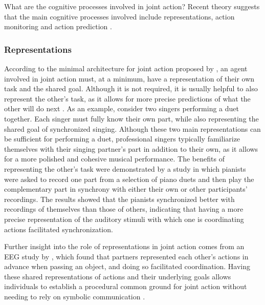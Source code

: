 \documentclass[10pt,a4paper,onecolumn]{article}
\begin{document}
What are the cognitive processes involved in joint action? Recent theory suggests that the main cognitive processes involved include representations, action monitoring and action prediction \autocite{vesperMinimalArchitectureJoint2010,loehrMonitoringIndividualJoint2013,sebanzJointActionBodies2006}.

\hypertarget{representations}{%
\subsubsection{Representations}\label{representations}}

According to the minimal architecture for joint action proposed by \textcite{vesperMinimalArchitectureJoint2010}, an agent involved in joint action must, at a minimum, have a representation of their own task and the shared goal. Although it is not required, it is usually helpful to also represent the other's task, as it allows for more precise predictions of what the other will do next \autocite{boltSensoryAttenuationAuditory2021}. As an example, consider two singers performing a duet together. Each singer must fully know their own part, while also representing the shared goal of synchronized singing. Although these two main representations can be sufficient for performing a duet, professional singers typically familiarize themselves with their singing partner's part in addition to their own, as it allows for a more polished and cohesive musical performance. The benefits of representing the other's task were demonstrated by a study \autocite{kellerPianistsDuetBetter2007} in which pianists were asked to record one part from a selection of piano duets and then play the complementary part in synchrony with either their own or other participants' recordings. The results showed that the pianists synchronized better with recordings of themselves than those of others, indicating that having a more precise representation of the auditory stimuli with which one is coordinating actions facilitated synchronization.

Further insight into the role of representations in joint action comes from an EEG study by \textcite{kourtisPredictiveRepresentationOther2012}, which found that partners represented each other's actions in advance when passing an object, and doing so facilitated coordination. Having these shared representations of actions and their underlying goals allows individuals to establish a procedural common ground for joint action without needing to rely on symbolic communication \autocite{sebanzJointActionBodies2006}.
\end{document}
